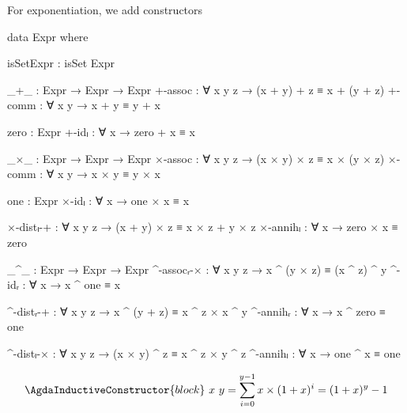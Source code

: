 For exponentiation, we add constructors
\begin{code}
  data Expr where
\end{code}
\begin{code}[hide]
    isSetExpr : isSet Expr

    _+_ : Expr → Expr → Expr
    +-assoc : ∀ x y z → (x + y) + z ≡ x + (y + z)
    +-comm : ∀ x y → x + y ≡ y + x

    zero : Expr
    +-idₗ : ∀ x → zero + x ≡ x

    _×_ : Expr → Expr → Expr
    ×-assoc : ∀ x y z → (x × y) × z ≡ x × (y × z)
    ×-comm : ∀ x y → x × y ≡ y × x

    one : Expr
    ×-idₗ : ∀ x → one × x ≡ x

    ×-distₗ-+ : ∀ x y z → (x + y) × z ≡ x × z + y × z
    ×-annihₗ : ∀ x → zero × x ≡ zero
\end{code}
\begin{code}
    _^_         : Expr → Expr → Expr
    ^-assocᵣ-×  : ∀ x y z → x ^ (y × z) ≡ (x ^ z) ^ y
    ^-idᵣ       : ∀ x → x ^ one ≡ x

    ^-distᵣ-+   : ∀ x y z → x ^ (y + z) ≡ x ^ z × x ^ y
    ^-annihᵣ    : ∀ x → x ^ zero ≡ one

    ^-distₗ-×   : ∀ x y z → (x × y) ^ z ≡ x ^ z × y ^ z
    ^-annihₗ    : ∀ x → one ^ x ≡ one
\end{code}
\[\AgdaInductiveConstructor{block}\ x\ y = \sum_{i=0}^{y-1} x \times (1 + x)^i = (1+x)^y - 1\]

